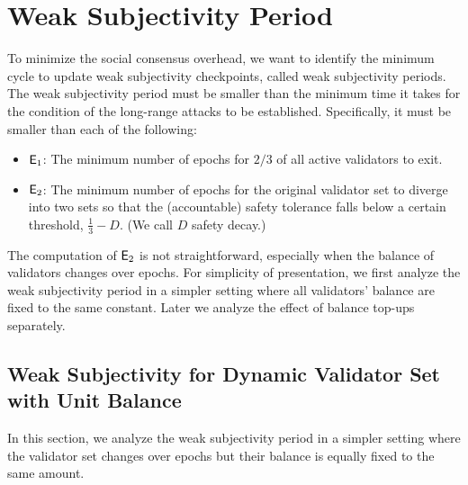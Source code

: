 \section{Weak Subjectivity Period}

To minimize the social consensus overhead, we want to identify the minimum cycle to update weak subjectivity checkpoints, called weak subjectivity periods.  The weak subjectivity period must be smaller than the minimum  time it takes for the condition of the long-range attacks to be established.  Specifically, it must be smaller than each of the following:
\begin{itemize}
\item $\mathsf{E}_1$:
The minimum number of epochs for $2/3$ of all active validators to exit.
\item $\mathsf{E}_2$:
The minimum number of epochs for the original validator set to diverge into two sets so that the (accountable) safety tolerance falls below a certain threshold, $\frac{1}{3} - D$. (We call $D$ safety decay.)
\end{itemize}

The computation of $\mathsf{E}_2$ is not straightforward, especially when the balance of validators changes over epochs.
For simplicity of presentation, we first analyze the weak subjectivity period in a simpler setting where all validators' balance are fixed to the same constant.
Later we analyze the effect of balance top-ups separately.

\subsection{Weak Subjectivity for Dynamic Validator Set with Unit Balance}

In this section, we analyze the weak subjectivity period in a simpler setting where the validator set changes over epochs but their balance is equally fixed to the same amount.

